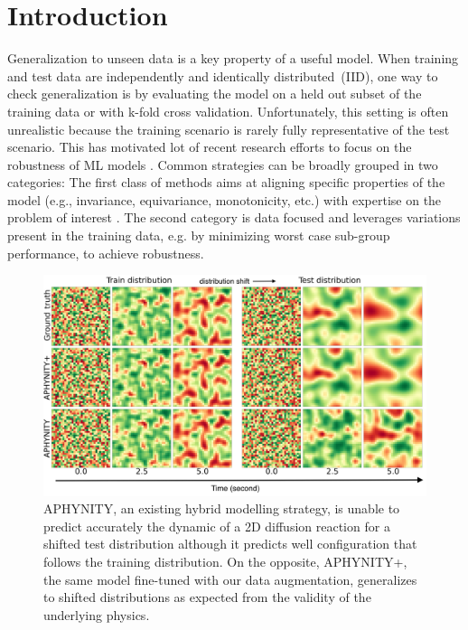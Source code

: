 \documentclass{article}
\begin{document}
\section{Introduction}
Generalization to unseen data is a key property of a useful model. When training and test data are independently and identically distributed~(IID), one way to check generalization is by evaluating the model on a held out subset of the training data or with k-fold cross validation. Unfortunately, this setting is often unrealistic because the training scenario is rarely fully representative of the test scenario. This has motivated lot of recent research efforts to focus on  the robustness of ML models  \citep{gulrajani2020search,geirhos2020shortcut,koh2021wilds}. Common strategies can be broadly grouped in two categories: The first class of methods aims at aligning specific properties of the model (e.g., invariance, equivariance, monotonicity, etc.) with expertise on the problem of interest \citep{cubuk2019autoaugment, graph_net_molecule, universal_equivariance, alphago}. The second category is data focused \citep{groupDRO_ICLR, IRM, krueger2021out, creager2021environment} and leverages variations present in the training data, e.g. by minimizing worst case sub-group performance, to achieve robustness.

\begin{figure}[t]
    \centering
    \vspace{-.5em}
    \includegraphics[width=.49\textwidth]{figures/improved_diffusion.png}
    \vspace{-2.em}
    \caption{APHYNITY, an existing hybrid modelling strategy, is unable to predict accurately the dynamic of a 2D diffusion reaction for a shifted test distribution although it predicts well configuration that follows the training distribution. On the opposite, APHYNITY+, the same model fine-tuned with our data augmentation, generalizes to shifted distributions as expected from the validity of the underlying physics.}
    \label{fig:diffusion_shift}
    \vspace{-1em}
\end{figure}
\end{document}

